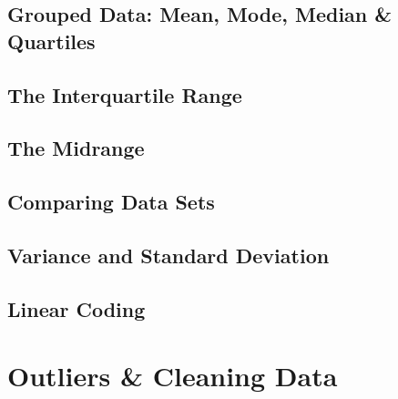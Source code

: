 \documentclass[../maths.tex]{subfiles}
\begin{document}
\subsection*{Grouped Data: Mean, Mode, Median \& Quartiles}
\subsection*{The Interquartile Range}
\subsection*{The Midrange}
\subsection*{Comparing Data Sets}
\subsection*{Variance and Standard Deviation}
\subsection*{Linear Coding}
\section{Outliers \& Cleaning Data}
\end{document}
